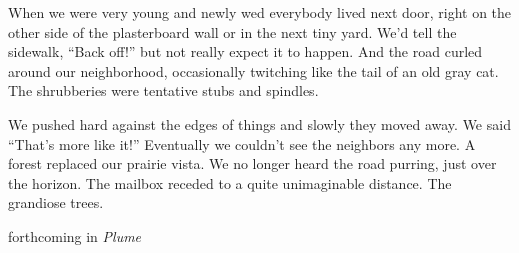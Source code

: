 When we were very young and newly wed everybody lived next door, right
on the other side of the plasterboard wall or in the next tiny yard.
We'd tell the sidewalk, ``Back off!'' but not really expect it to
happen. And the road curled around our neighborhood, occasionally
twitching like the tail of an old gray cat. The shrubberies were
tentative stubs and spindles.

We pushed hard against the edges of things and slowly they moved away.
We said ``That's more like it!'' Eventually we couldn't see the
neighbors any more. A forest replaced our prairie vista. We no longer
heard the road purring, just over the horizon. The mailbox receded to a
quite unimaginable distance. The grandiose trees.

forthcoming in \emph{Plume}
